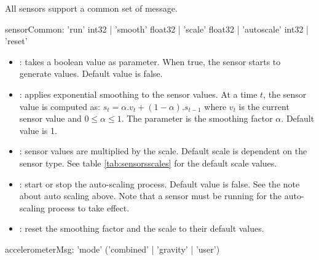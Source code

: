 \label{sensorCommonMsgs}

All sensors support a common set of message. 


\begin{rail}
sensorCommon:  'run' 	int32
			|  'smooth' float32 
			|  'scale' 	float32  
			|  'autoscale' int32  
			|  'reset'  
\end{rail}

\begin{itemize}
\item {}: takes a boolean value as parameter. When true, the sensor starts to generate values. Default value is false.
\item {}: applies exponential smoothing to the sensor values. At a time $t$, the sensor value is computed as:
$s_t = \alpha.v_t + (1-\alpha).s_{t-1}$ where $v_t$ is the current sensor value and $0 \leqslant \alpha \leqslant 1$.
The parameter is the smoothing factor $\alpha$. Default value is 1.
\item {}: sensor values are multiplied by the scale. Default scale is dependent on the sensor type. See table \ref{tab:sensorsscales} for the default scale values.
\item {}: start or stop the auto-scaling process. Default value is false. See the note about auto scaling above. Note that a sensor must be running for the auto-scaling process to take effect.
\item {}: reset the smoothing factor and the scale to their default values.
\end{itemize}


\label{sensorSpecifcMsgs}

\label{Accelerometer}


\begin{rail}
accelerometerMsg: 	  'mode' ('combined' | 'gravity' | 'user')
\end{rail}

